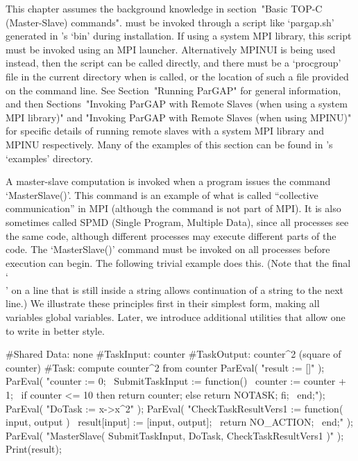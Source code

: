 

This chapter assumes the background  knowledge  in  section~"Basic  TOP-C
(Master-Slave) commands". {\ParGAP} must be invoked through a script like
`pargap.sh'  generated  in  {\ParGAP}'s  `bin'  during  installation.  
If using a system MPI library, this script must be invoked using an MPI
launcher. Alternatively MPINUI is being used instead, then the script can
be called directly, and there must be a `procgroup' file in the current 
directory  when {\ParGAP} is called, or the location of such a file provided
on the command line. See Section~"Running ParGAP"
for general information, and then Sections~"Invoking ParGAP with Remote Slaves 
(when using a system MPI library)" and "Invoking ParGAP with Remote Slaves 
(when using MPINU)" for specific details of running remote slaves with
a system MPI library and MPINU respectively. Many of
the examples of this section  can  be  found  in  {\ParGAP}'s  `examples'
directory.


A master-slave computation is invoked when a {\ParGAP} program issues the
command `MasterSlave()'. This command is an example  of  what  is  called
``collective communication'' in MPI (although the command is not part  of
MPI). It is also sometimes called SPMD (Single Program,  Multiple  Data),
since all processes see the same code, although different  processes  may
execute different parts of the code. The `MasterSlave()' command must  be
invoked on all  processes  before  execution  can  begin.  The  following
trivial example does this. (Note that the final `\\' on a  line  that  is
still inside a string allows continuation of a string to the next  line.)
We illustrate these principles first in their simplest form,  making  all
variables global variables.  Later,  we  introduce  additional  {\ParGAP}
utilities that allow one to write in better style.

\beginexample
#Shared Data: none
#TaskInput:   counter
#TaskOutput:  counter^2 (square of counter)
#Task:        compute counter^2 from counter
ParEval( "result := []" );
ParEval( "counter := 0; \
          SubmitTaskInput := function() \
            counter := counter + 1; \
            if counter <= 10 then return counter; else return NOTASK; fi; \
          end;");
ParEval( "DoTask := x->x^2" );
ParEval( "CheckTaskResultVers1 := function( input, output ) \
            result[input] := [input, output]; \
            return NO_ACTION; \
          end;" );
ParEval( "MasterSlave( SubmitTaskInput, DoTask, CheckTaskResultVers1 )" );
Print(result);
\endexample

